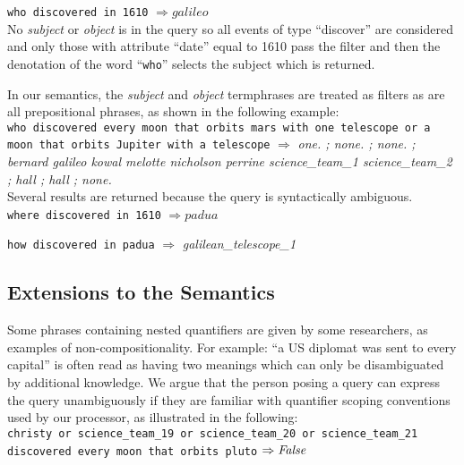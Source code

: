 \documentclass[../main.tex]{subfiles}
\begin{document}
\begin{refsection}
\noindent \texttt{who discovered in 1610} $\Rightarrow \mathit{galileo}$ \\

No \textit{subject} or \textit{object} is in the query so all events of type ``discover'' are considered and only those with attribute ``date'' equal to 1610 pass the filter and then the denotation of the word ``\texttt{who}'' selects the subject which is returned.

In our semantics, the \textit{subject} and \textit{object} termphrases are treated as filters as are all prepositional phrases, as shown in the following example: \\

\noindent \texttt{who discovered every moon that orbits mars with one telescope or a \\ moon that orbits Jupiter with a telescope} $\Rightarrow$ \textit{one. ; none. ; none. ; bernard galileo kowal melotte nicholson perrine science\_team\_1 science\_team\_2 ; hall ; hall ; none.} \\

Several results are returned because the query is syntactically ambiguous. \\

\noindent \texttt{where discovered in 1610} $\Rightarrow \mathit{padua}$

\noindent \texttt{how discovered in padua} $\Rightarrow$ \textit{galilean\_telescope\_1}

\subsection{Extensions to the Semantics}
\label{webist2019conf:extend}

Some phrases containing nested quantifiers are given by some researchers, as examples of non-compositionality. For example: ``a US diplomat was sent to every capital'' is often read as having two meanings which can only be disambiguated by additional knowledge. We argue that the person posing a query can express the query unambiguously if they are familiar with quantifier scoping conventions used by our processor, as illustrated in the following: \\

\noindent \texttt{christy or science\_team\_19 or science\_team\_20 or science\_team\_21 \\ discovered every moon that orbits pluto} $\Rightarrow \mathit{False}$ \\


\end{refsection}
\end{document}
